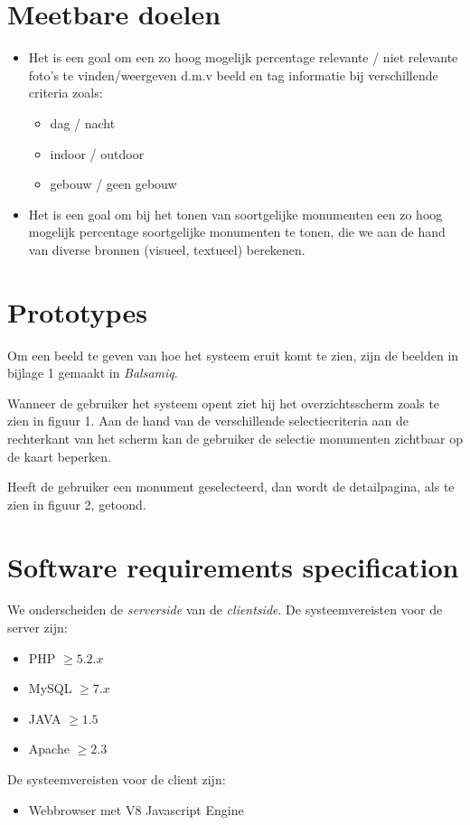 \documentclass{article}
\begin{document}
\section{Meetbare doelen}
\begin{itemize}
	\item Het is een goal om een zo hoog mogelijk percentage relevante / niet relevante foto's te vinden/weergeven d.m.v beeld en tag informatie bij verschillende criteria zoals:
	\begin{itemize}
		\item dag / nacht
		\item indoor / outdoor
		\item gebouw / geen gebouw
	\end{itemize}
	\item Het is een goal om bij het tonen van soortgelijke monumenten een zo hoog mogelijk percentage soortgelijke monumenten te tonen, die we aan de hand van diverse bronnen (visueel, textueel) berekenen.
\end{itemize}

\section{Prototypes}
Om een beeld te geven van hoe het systeem eruit komt te zien, zijn de beelden in bijlage 1 gemaakt in \emph{Balsamiq}. 

Wanneer de gebruiker het systeem opent ziet hij het overzichtsscherm zoals te zien in figuur 1. Aan de hand van de verschillende selectiecriteria aan de rechterkant van het scherm kan de gebruiker de selectie monumenten zichtbaar op de kaart beperken.

Heeft de gebruiker een monument geselecteerd, dan wordt de detailpagina, als te zien in figuur 2, getoond. 

\section{Software requirements specification}
We onderscheiden de \emph{serverside} van de \emph{clientside}.
De systeemvereisten voor de server zijn:
\begin{itemize}
	\item{PHP $\geq 5.2.x$}
	\item{MySQL $\geq 7.x$}
	\item{JAVA $\geq 1.5$}
	\item{Apache $\geq 2.3$}
\end{itemize}
De systeemvereisten voor de client zijn:
\begin{itemize}
	\item{Webbrowser met V8 Javascript Engine}
\end{itemize}
\clearpage
\end{document}
